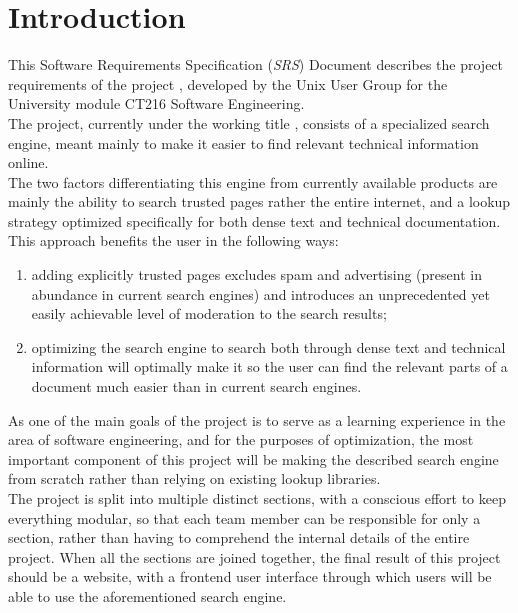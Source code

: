 \section{Introduction}

This Software Requirements Specification (\textit{SRS}) Document describes the project requirements of the project \projectname, 
developed by the Unix User Group for the University module CT216 Software Engineering. \\

The project, currently under the working title \projectname, consists of a specialized search engine, meant mainly to make it easier to find relevant technical information online. \\

The two factors differentiating this engine from currently available products are mainly the ability to search trusted pages rather the entire internet, 
and a lookup strategy optimized specifically for both dense text and technical documentation.
This approach benefits the user in the following ways:
\begin{enumerate}
    \item adding explicitly trusted pages excludes spam and advertising (present in abundance in current search engines) and introduces an unprecedented yet easily achievable level of moderation to the search results;
    \item optimizing the search engine to search both through dense text and technical information will optimally make it so the user can find the relevant parts of a document much easier than in current search engines.
\end{enumerate}

As one of the main goals of the project is to serve as a learning experience in the area of software engineering, and for the purposes of optimization, 
the most important component of this project will be making the described search engine from scratch rather than relying on existing lookup libraries. \\

The project is split into multiple distinct sections, with a conscious effort to keep everything modular, so that each team member can be responsible for only a section,
rather than having to comprehend the internal details of the entire project.
When all the sections are joined together, the final result of this project should be a website, with a frontend user interface through which users will be able to use the aforementioned search engine. \\

